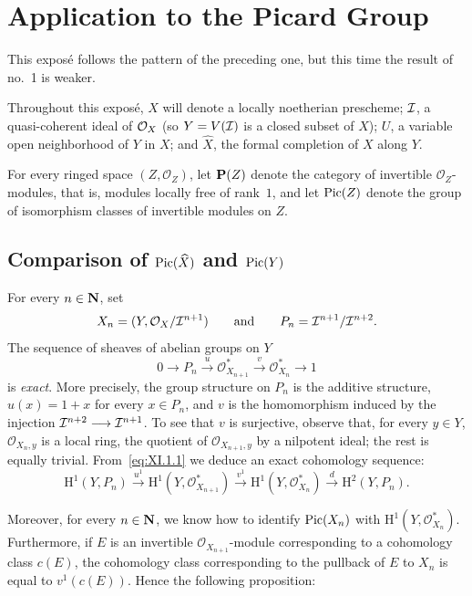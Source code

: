 \chapter{Application to the Picard Group}\label{XI}
\medskip
This expos\'e follows the pattern of the preceding one, but this time the result of no.~1 is weaker.

\medskip
Throughout this expos\'e, $X$ will denote a locally noetherian prescheme;
$\mathcal I$, a quasi-coherent ideal of $\mathcal O_X$ (so $Y=V(\mathcal I)$ is a closed subset of
$X$); $U$, a variable open neighborhood of $Y$ in $X$; and $\widehat X$,
the formal completion of $X$ along $Y$.

For every ringed space $(Z,\mathcal O_Z)$, let $\mathbf P(Z)$\label{pXI.1}
denote the category of invertible $\mathcal O_Z$-modules, that is, modules locally
free of rank~$1$, and let $\operatorname{Pic}(Z)$ denote the group of isomorphism classes of
invertible modules on $Z$.

\section{Comparison of $\operatorname{Pic}(\widehat X)$ and $\operatorname{Pic}(Y)$}\label{XI.1}

For every $n\in\mathbf N$, set
\[
X_n=(Y,\mathcal O_X/\mathcal I^{n+1})
\qquad\text{and}\qquad
P_n=\mathcal I^{n+1}/\mathcal I^{n+2}.
\]
The sequence of sheaves of abelian groups on $Y$
\begin{equation}\label{eq:XI.1.1}
0\longrightarrow P_n\xrightarrow{u}\mathcal O_{X_{n+1}}^*
\xrightarrow{v}\mathcal O_{X_n}^*\longrightarrow 1
\end{equation}
is \emph{exact}. More precisely, the group structure on $P_n$ is the additive
structure, $u(x)=1+x$ for every $x\in P_n$, and $v$ is the homomorphism induced
by the injection $\mathcal I^{n+2}\longrightarrow\mathcal I^{n+1}$. To see that $v$ is
surjective, observe that, for every $y\in Y$, $\mathcal O_{X_n,y}$ is a local
ring, the quotient of $\mathcal O_{X_{n+1},y}$ by a nilpotent ideal; the rest is
equally trivial. From~\eqref{eq:XI.1.1} we deduce an exact cohomology sequence:
\begin{equation*}\tag{$*$}\label{eq:XI.1.*}
\mathrm H^1(Y,P_n)\xrightarrow{u^1}\mathrm H^1(Y,\mathcal O_{X_{n+1}}^*)
\xrightarrow{v^1}\mathrm H^1(Y,\mathcal O_{X_n}^*)
\xrightarrow{d}\mathrm H^2(Y,P_n).
\end{equation*}

Moreover, for every $n\in\mathbf N$, we know how to identify
$\operatorname{Pic}(X_n)$ with $\mathrm H^1(Y,\mathcal O_{X_n}^*)$. Furthermore, if $E$
is an invertible $\mathcal O_{X_{n+1}}$-module corresponding to a cohomology
class $c(E)$\pageoriginale, the cohomology class corresponding to the pullback
of $E$ to $X_n$ is equal to $v^1(c(E))$. Hence the following proposition:

